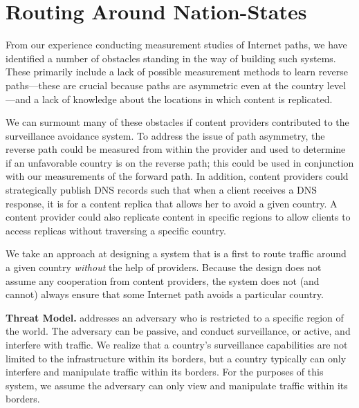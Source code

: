 \section{Routing Around Nation-States}
\label{system_design}


From our experience conducting measurement studies of Internet paths, we have identified 
a number of obstacles standing in the way of building such systems.  These primarily include a lack 
of possible measurement methods to learn reverse paths---these are crucial because paths 
are asymmetric even at the country level---and a lack of knowledge about the locations in which 
content is replicated.  

We can surmount many of these obstacles if content providers contributed to the surveillance 
avoidance system.  To address the issue of path asymmetry, the reverse path could be measured from within the provider and used to determine if 
an unfavorable country is on the reverse path; this could be used in conjunction with our measurements 
of the forward path.  In addition, content providers could strategically publish DNS records such that when a client receives 
a DNS response, it is for a content replica that allows her to avoid a given country.  A content provider could also 
replicate content in specific regions to allow clients to access replicas without traversing a specific 
country. 

We take an approach at designing 
a system that is a first to route traffic around a given country {\it without} the help 
of providers.  Because the design does not assume any cooperation from content providers, 
the system does not (and cannot) always ensure that some Internet path avoids a 
particular country. 

{\bf Threat Model.} \system{} addresses an adversary who is restricted to a specific region of the world.  The 
adversary can be passive, and conduct surveillance, or active, and interfere with traffic. We 
realize that a country's surveillance capabilities are not limited to the infrastructure within 
its borders, but a country typically can only interfere and manipulate traffic within its borders. 
For the purposes of this system, we assume the adversary can only view and manipulate traffic 
within its borders.

